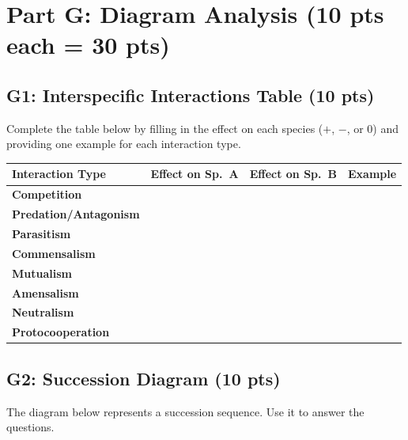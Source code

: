 \documentclass[11pt]{article}
\begin{document}
\section*{Part G: Diagram Analysis (10 pts each = 30 pts)}

\subsection*{G1: Interspecific Interactions Table (10 pts)}
Complete the table below by filling in the effect on each species ($+$, $-$, or $0$) and providing one example for each interaction type.

\vspace{0.3cm}
\begin{tabular}{>{\bfseries}p{3.5cm} p{2.5cm} p{2.5cm} p{5cm}}
\toprule
\textbf{Interaction Type} & \textbf{Effect on Sp.\ A} & \textbf{Effect on Sp.\ B} & \textbf{Example} \\
\midrule
Competition & & & \\[0.8cm]
Predation/Antagonism & & & \\[0.8cm]
Parasitism & & & \\[0.8cm]
Commensalism & & & \\[0.8cm]
Mutualism & & & \\[0.8cm]
Amensalism & & & \\[0.8cm]
Neutralism & & & \\[0.8cm]
Protocooperation & & & \\[0.5cm]
\bottomrule
\end{tabular}

\vspace{0.5cm}

\subsection*{G2: Succession Diagram (10 pts)}
The diagram below represents a succession sequence. Use it to answer the questions.

\vspace{0.3cm}
\begin{center}
\end{center}
\end{document}
